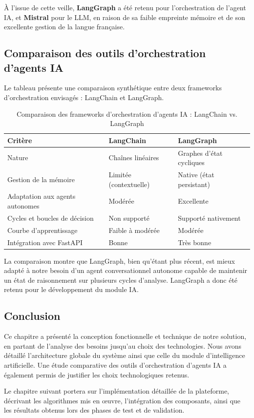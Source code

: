 À l’issue de cette veille, \textbf{LangGraph} a été retenu pour l’orchestration de l’agent IA, et \textbf{Mistral} pour le LLM, en raison de sa faible empreinte mémoire et de son excellente gestion de la langue française.

\subsection{Comparaison des outils d’orchestration d’agents IA}
Le tableau  présente une comparaison synthétique entre deux frameworks d’orchestration envisagés : LangChain et LangGraph.

\begin{table}[H]
\centering
\renewcommand{\arraystretch}{1.2}
\caption{Comparaison des frameworks d’orchestration d’agents IA : LangChain vs. LangGraph}
\begin{tabular}{|l|l|l|}
\hline
\textbf{Critère} & \textbf{LangChain} & \textbf{LangGraph} \\
\hline
Nature & Chaînes linéaires & Graphes d’état cycliques \\
Gestion de la mémoire & Limitée (contextuelle) & Native (état persistant) \\
Adaptation aux agents autonomes & Modérée & Excellente \\
Cycles et boucles de décision & Non supporté & Supporté nativement \\
Courbe d’apprentissage & Faible à modérée & Modérée \\
Intégration avec FastAPI & Bonne & Très bonne \\
\hline
\end{tabular}
\label{tab:comparaison_orchestration}
\end{table}

La comparaison montre que LangGraph, bien qu’étant plus récent, est mieux adapté à notre besoin d’un agent conversationnel autonome capable de maintenir un état de raisonnement sur plusieurs cycles d’analyse. LangGraph a donc été retenu pour le développement du module IA.

\subsection{Conclusion}
Ce chapitre a présenté la conception fonctionnelle et technique de notre solution, en partant de l’analyse des besoins jusqu’au choix des technologies. Nous avons détaillé l’architecture globale du système ainsi que celle du module d’intelligence artificielle. Une étude comparative des outils d’orchestration d’agents IA a également permis de justifier les choix technologiques retenus.

Le chapitre suivant portera sur l’implémentation détaillée de la plateforme, décrivant les algorithmes mis en œuvre, l’intégration des composants, ainsi que les résultats obtenus lors des phases de test et de validation.